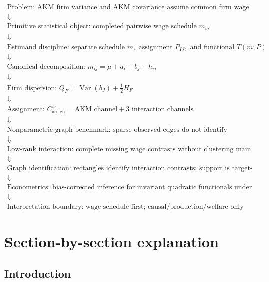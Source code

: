\documentclass[11pt]{article}
\newcommand{\Var}{\operatorname{Var}}
\begin{document}
\[
\begin{array}{c}
\boxed{\text{Problem: AKM firm variance and AKM covariance assume common firm wage gaps}}\\[0.5em]
\Downarrow\\[0.5em]
\boxed{\text{Primitive statistical object: completed pairwise wage schedule }m_{ij}}\\[0.5em]
\Downarrow\\[0.5em]
\boxed{\text{Estimand discipline: separate schedule }m,\text{ assignment }P_{IJ},
\text{ and functional }T(m;P)}\\[0.5em]
\Downarrow\\[0.5em]
\boxed{\text{Canonical decomposition: }m_{ij}=\mu+a_i+b_j+h_{ij}}\\[0.5em]
\Downarrow\\[0.5em]
\boxed{\text{Firm dispersion: }Q_F=\Var(b_J)+\frac{1}{2}H_F}\\[0.5em]
\Downarrow\\[0.5em]
\boxed{\text{Assignment: }C^w_{\mathrm{assign}}
=\text{AKM channel}+3\text{ interaction channels}}\\[0.5em]
\Downarrow\\[0.5em]
\boxed{\text{Nonparametric graph benchmark: sparse observed edges do not identify
cardinal targets}}\\[0.5em]
\Downarrow\\[0.5em]
\boxed{\text{Low-rank interaction: complete missing wage contrasts without
clustering main effects}}\\[0.5em]
\Downarrow\\[0.5em]
\boxed{\text{Graph identification: rectangles identify interaction contrasts;
support is target-specific}}\\[0.5em]
\Downarrow\\[0.5em]
\boxed{\text{Econometrics: bias-corrected inference for invariant quadratic
functionals under sparse mobility}}\\[0.5em]
\Downarrow\\[0.5em]
\boxed{\text{Interpretation boundary: wage schedule first; causal/production/welfare
only with extra assumptions}}
\end{array}
\]

\section{Section-by-section explanation}

\subsection{Introduction}
\end{document}
